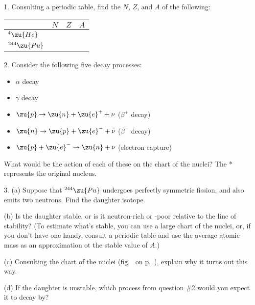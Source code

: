 
1. Consulting a periodic table, find the $N$, $Z$, and $A$ of the following:

\begin{tabular}{|l|p{15mm}|p{15mm}|p{15mm}|}
\hline
& $N$ & $Z$ & $A$ \\
\hline
${}^4\zu{He}$ & & & \\
\hline
${}^{244}\zu{Pu}$ & & & \\
\hline
\end{tabular}

\vfill

2. Consider the following five decay processes:

\begin{itemize}

\item $\alpha$ decay

\item $\gamma$ decay

\item $\zu{p} \rightarrow \zu{n} + \zu{e}^+ + \nu$ ($\beta^+$ decay)

\item $\zu{n} \rightarrow \zu{p} + \zu{e}^- + \bar{\nu}$ ($\beta^-$ decay)

\item $\zu{p} + \zu{e}^- \rightarrow \zu{n} + \nu$ (electron capture)
\end{itemize}

What would be the action of each of these on the chart of the nuclei? The * represents the original nucleus.


\vfill

3. (a) Suppose that ${}^{244}\zu{Pu}$ undergoes perfectly symmetric fission, and also emits two neutrons.
Find the daughter isotope.

(b) Is the daughter stable, or is it neutron-rich or -poor relative to the line of stability? (To estimate
what's stable, you can use a large chart of the nuclei, or, if you don't have one handy,
consult a periodic table and use the average atomic mass as an
approximation ot the stable value of $A$.)

(c) Consulting the chart of the nuclei (fig.~ on p.~\pageref{fig:chartofnuclei}),
explain why it turns out this way.

(d) If the daughter is unstable, which process from question \#2
would you expect it to decay by?
